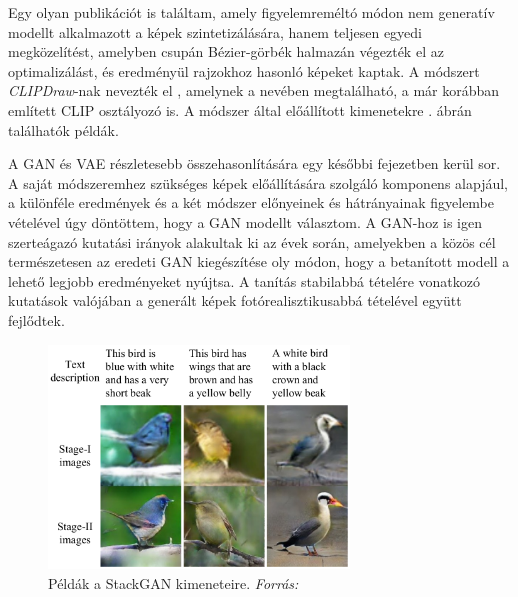 Egy olyan publikációt is találtam, amely figyelemreméltó módon nem generatív modellt alkalmazott a képek szintetizálására, hanem teljesen egyedi megközelítést, amelyben csupán Bézier-görbék halmazán végezték el az optimalizálást, és eredményül rajzokhoz hasonló képeket kaptak. A módszert \textit{CLIPDraw}-nak nevezték el \cite{frans2021clipdraw}, amelynek a nevében megtalálható, a már korábban említett CLIP osztályozó is. A módszer által előállított kimenetekre . ábrán találhatók példák.

A GAN és VAE részletesebb összehasonlítására egy későbbi fejezetben kerül sor. A saját módszeremhez szükséges képek előállítására szolgáló komponens alapjául, a különféle eredmények és a két módszer előnyeinek és hátrányainak figyelembe vételével úgy döntöttem, hogy a GAN modellt választom.
A GAN-hoz is igen szerteágazó kutatási irányok alakultak ki az évek során, amelyekben a közös cél természetesen az eredeti GAN kiegészítése oly módon, hogy a betanított modell a lehető legjobb eredményeket nyújtsa. A tanítás stabilabbá tételére vonatkozó kutatások valójában a generált képek fotórealisztikusabbá tételével együtt fejlődtek.

\begin{figure}[h]
	\centering
	\includegraphics[width=8cm]{images/stackGAN.png}
	\caption{Példák a StackGAN kimeneteire. \textit{Forrás:} \cite{zhang2017stackgan}}
	\label{fig:stackgan}
\end{figure}

